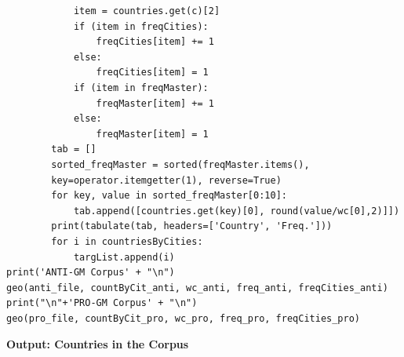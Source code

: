 \begin{lstlisting}
            item = countries.get(c)[2]
            if (item in freqCities): 
                freqCities[item] += 1
            else: 
                freqCities[item] = 1
            if (item in freqMaster): 
                freqMaster[item] += 1
            else: 
                freqMaster[item] = 1
        tab = []
        sorted_freqMaster = sorted(freqMaster.items(), 
        key=operator.itemgetter(1), reverse=True)
        for key, value in sorted_freqMaster[0:10]:
            tab.append([countries.get(key)[0], round(value/wc[0],2)]])
        print(tabulate(tab, headers=['Country', 'Freq.']))
        for i in countriesByCities:
            targList.append(i)
print('ANTI-GM Corpus' + "\n")   
geo(anti_file, countByCit_anti, wc_anti, freq_anti, freqCities_anti)
print("\n"+'PRO-GM Corpus' + "\n")   
geo(pro_file, countByCit_pro, wc_pro, freq_pro, freqCities_pro)
\end{lstlisting}

\textbf{Output: Countries in the Corpus}

